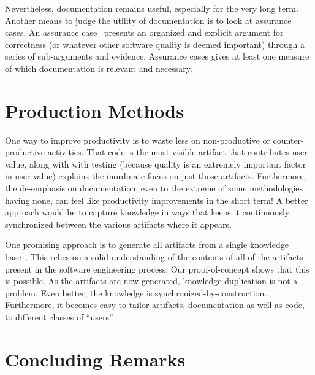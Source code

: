 \documentclass[sigconf, authorversion, nonacm]{acmart}
\begin{document}
Nevertheless, documentation remains useful, especially for the very long
term. Another means to judge the utility of documentation is to look at
assurance cases. An assurance case~\cite{RinehartEtAl2015} presents an
organized and explicit argument for correctness (or whatever other software
quality is deemed important) through a series of sub-arguments and evidence.
Assurance cases gives at least one measure of which documentation is relevant and
necessary.

\section{Production Methods}

One way to improve productivity is to waste less on non-productive or
counter-productive activities. That code is the most visible artifact that
contributes user-value, along with with testing (because quality is an
extremely important factor in user-value) explains the inordinate focus
on just those artifacts. Furthermore, the de-emphasis on documentation, even to
the extreme of some methodologies having none, can feel like productivity
improvements in the short term!  A better approach would be to capture
knowledge in ways that keeps it continuously synchronized between the
various artifacts where it appears.

One promising approach is to generate all artifacts from a single
knowledge base~\cite{SzymczakEtAl2016}.  This relies on a solid understanding
of the contents of all of the artifacts present in the software engineering
process. Our proof-of-concept shows that this is possible. As the artifacts
are now generated, knowledge duplication is not a problem. Even better, the
knowledge is synchronized-by-construction. Furthermore, it becomes easy to
tailor artifacts, documentation as well as code, to different classes of
``users''. 


\section{Concluding Remarks}
\end{document}
